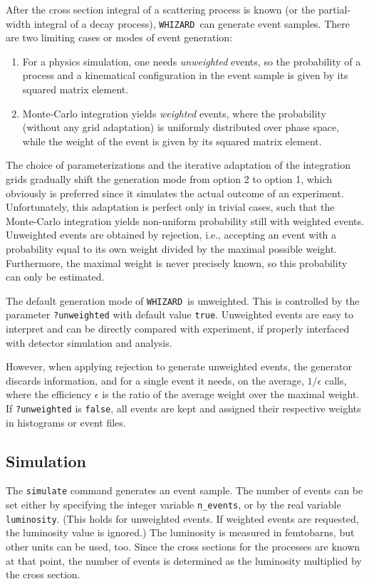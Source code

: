\documentclass[12pt]{book}
\newcommand{\ttt}[1]{\texttt{#1}}
\newcommand{\whizard}{\ttt{WHIZARD}}
\begin{document}
After the cross section integral of a scattering process is known (or the
partial-width integral of a decay process), \whizard\ can generate event
samples.  There are two limiting cases or modes of event generation:
\begin{enumerate}
\item
  For a physics simulation, one needs \emph{unweighted} events, so the
  probability of a process and a kinematical configuration in the event sample
  is given by its squared matrix element.
\item
  Monte-Carlo integration yields \emph{weighted} events, where the probability
  (without any grid adaptation) is uniformly distributed over phase space,
  while the weight of the event is given by its squared matrix element.
\end{enumerate}
The choice of parameterizations and the iterative adaptation of the
integration grids gradually shift the generation mode from option 2 to option
1, which obviously is preferred since it simulates the actual outcome of an
experiment.  Unfortunately, this adaptation is perfect only in trivial cases,
such that the Monte-Carlo integration yields non-uniform probability still
with weighted events.  Unweighted events are obtained by rejection, i.e.,
accepting an event with a probability equal to its own weight divided by the
maximal possible weight.  Furthermore, the maximal weight is never precisely
known, so this probability can only be estimated.

The default generation mode of \whizard\ is unweighted.  This is controlled by
the parameter \verb|?unweighted| with default value \ttt{true}.  Unweighted
events are easy to interpret and can be directly compared with experiment, if
properly interfaced with detector simulation and analysis.

However, when applying rejection to generate unweighted events, the generator
discards information, and for a single event it needs, on the average,
$1/\epsilon$ calls, where the efficiency $\epsilon$ is the ratio of the
average weight over the maximal weight.  If \verb|?unweighted| is \ttt{false},
all events are kept and assigned their respective weights in histograms or
event files.


\subsection{Simulation}
\label{sec:simulation}

The \ttt{simulate} command generates an event sample.  The number of events
can be set either by specifying the integer variable \verb|n_events|, or by
the real variable \verb|luminosity|.  (This holds for unweighted events.  If
weighted events are requested, the luminosity value is ignored.)  The
luminosity is measured in
femtobarns, but other units can be used, too.  Since the cross sections for the
processes are known at that point, the number of events is determined as the
luminosity multiplied by the cross section.
\end{document}
